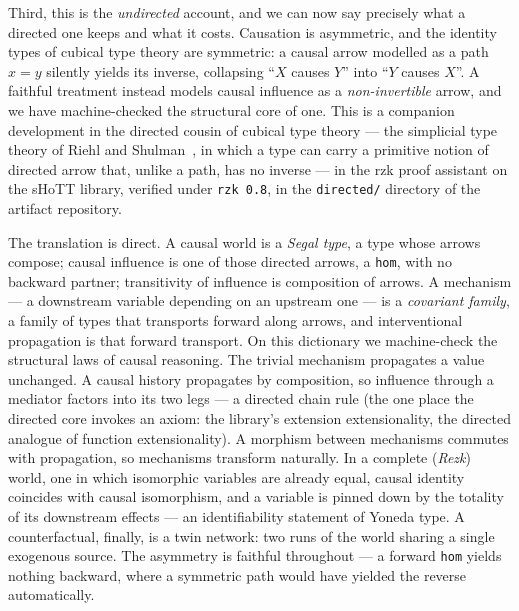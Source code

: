 \documentclass{lmcs}
\begin{document}
Third, this is the \emph{undirected} account, and we can now say precisely what a directed one keeps and what it costs.
Causation is asymmetric, and the identity types of cubical type theory are symmetric: a causal arrow modelled as a path $x = y$ silently yields its inverse, collapsing ``$X$ causes $Y$'' into ``$Y$ causes $X$''.
A faithful treatment instead models causal influence as a \emph{non-invertible} arrow, and we have machine-checked the structural core of one.
This is a companion development in the directed cousin of cubical type theory --- the simplicial type theory of Riehl and Shulman~\cite{riehl-shulman-2017}, in which a type can carry a primitive notion of directed arrow that, unlike a path, has no inverse --- in the rzk proof assistant on the sHoTT library, verified under \texttt{rzk 0.8}, in the \texttt{directed/} directory of the artifact repository.

The translation is direct.
A causal world is a \emph{Segal type}, a type whose arrows compose; causal influence is one of those directed arrows, a \texttt{hom}, with no backward partner; transitivity of influence is composition of arrows.
A mechanism --- a downstream variable depending on an upstream one --- is a \emph{covariant family}, a family of types that transports forward along arrows, and interventional propagation is that forward transport.
On this dictionary we machine-check the structural laws of causal reasoning.
The trivial mechanism propagates a value unchanged.
A causal history propagates by composition, so influence through a mediator factors into its two legs --- a directed chain rule (the one place the directed core invokes an axiom: the library's extension extensionality, the directed analogue of function extensionality).
A morphism between mechanisms commutes with propagation, so mechanisms transform naturally.
In a complete (\emph{Rezk}) world, one in which isomorphic variables are already equal, causal identity coincides with causal isomorphism, and a variable is pinned down by the totality of its downstream effects --- an identifiability statement of Yoneda type.
A counterfactual, finally, is a twin network: two runs of the world sharing a single exogenous source.
The asymmetry is faithful throughout --- a forward \texttt{hom} yields nothing backward, where a symmetric path would have yielded the reverse automatically.
\end{document}
